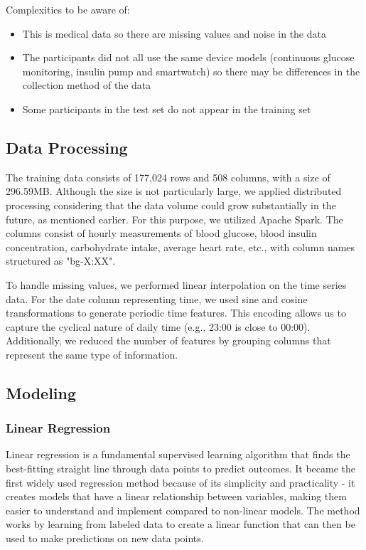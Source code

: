 \documentclass[
	a4paper, %
	10pt, %
	unnumberedsections, %
	twoside, %
]{LTJournalArticle}
\begin{document}
Complexities to be aware of:
\begin{itemize}
	\item This is medical data so there are missing values and noise in the data
	\item The participants did not all use the same device models (continuous glucose monitoring, insulin pump and smartwatch) so there may be differences in the collection method of the data
	\item Some participants in the test set do not appear in the training set
\end{itemize}



\subsection{Data Processing}

The training data consists of 177,024 rows and 508 columns, with a size of 296.59MB. Although the size is not particularly large, we applied distributed processing considering that the data volume could grow substantially in the future, as mentioned earlier. For this purpose, we utilized Apache Spark. The columns consist of hourly measurements of blood glucose, blood insulin concentration, carbohydrate intake, average heart rate, etc., with column names structured as "bg-X:XX".

To handle missing values, we performed linear interpolation on the time series data. For the date column representing time, we used sine and cosine transformations to generate periodic time features. This encoding allows us to capture the cyclical nature of daily time (e.g., 23:00 is close to 00:00). Additionally, we reduced the number of features by grouping columns that represent the same type of information.

\subsection{Modeling}

\subsubsection{Linear Regression}
Linear regression is a fundamental supervised learning algorithm that finds the best-fitting straight line through data points to predict outcomes. It became the first widely used regression method because of its simplicity and practicality - it creates models that have a linear relationship between variables, making them easier to understand and implement compared to non-linear models. The method works by learning from labeled data to create a linear function that can then be used to make predictions on new data points.
\end{document}
